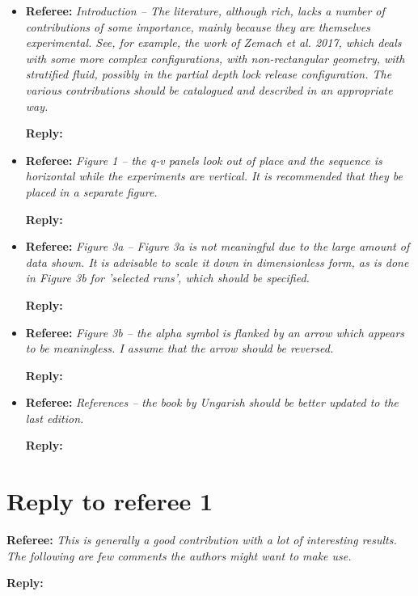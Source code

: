 \documentclass[12pt]{article}
\newcommand{\MinorReply}[3]{\filbreak\noindent
\textbf{Referee:}
\emph{#1 -- #2}

\textbf{Reply:} {\color{blue}{#3}}
}
\newcommand{\MajorReply}[2]{\noindent
\textbf{Referee:}
\emph{#1}

\medskip
\noindent\textbf{Reply:} {\color{blue}#2}
\vspace*{0.4 cm}}
\begin{document}
\begin{itemize}
    \item \MinorReply{Introduction}{The literature, although rich, lacks a number of contributions of some importance, mainly because they are themselves experimental. See, for example, the work of Zemach et al. 2017, which deals with some more complex configurations, with non-rectangular geometry, with stratified fluid, possibly in the partial depth lock release configuration. The various contributions should be catalogued and described in an appropriate way.}{}

    \item \MinorReply{Figure 1}{the q-v panels look out of place and the sequence is horizontal while the experiments are vertical. It is recommended that they be placed in a separate figure.}{}

    \item \MinorReply{Figure 3a}{Figure 3a is not meaningful due to the large amount of data shown. It is advisable to scale it down in dimensionless form, as is done in Figure 3b for 'selected runs', which should be specified.}{}

    \item \MinorReply{Figure 3b}{the alpha symbol is flanked by an arrow which appears to be meaningless. I assume that the arrow should be reversed.}{}

    \item \MinorReply{References}{the book by Ungarish should be better updated to the last edition.}{}
\end{itemize}


\newpage
\section{Reply to referee 1}

\MajorReply{This is generally a good contribution with a lot of interesting results. The following are few comments the authors might want to make use.}{}
\end{document}

